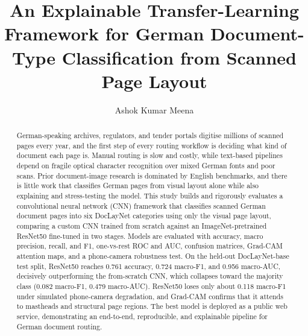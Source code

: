 \documentclass[preprint,12pt]{elsarticle}
\begin{document}
\begin{frontmatter}

\title{An Explainable Transfer-Learning Framework for German Document-Type
Classification from Scanned Page Layout}

\author[label1]{Ashok Kumar Meena}

\begin{abstract}
German-speaking archives, regulators, and tender portals digitise millions of
scanned pages every year, and the first step of every routing workflow is
deciding what kind of document each page is.
Manual routing is slow and costly, while text-based pipelines depend on
fragile optical character recognition over mixed German fonts and poor scans.
Prior document-image research is dominated by English benchmarks, and there is
little work that classifies German pages from visual layout alone while also
explaining and stress-testing the model.
This study builds and rigorously evaluates a convolutional neural network (CNN)
framework that classifies scanned German document pages into six DocLayNet
categories using only the visual page layout, comparing a custom CNN trained
from scratch against an ImageNet-pretrained ResNet50 fine-tuned in two stages.
Models are evaluated with accuracy, macro precision, recall, and F1, one-vs-rest
ROC and AUC, confusion matrices, Grad-CAM attention maps, and a phone-camera
robustness test.
On the held-out DocLayNet-base test split, ResNet50 reaches 0.761 accuracy,
0.724 macro-F1, and 0.956 macro-AUC, decisively outperforming the from-scratch
CNN, which collapses toward the majority class (0.082 macro-F1, 0.479 macro-AUC).
ResNet50 loses only about 0.118 macro-F1 under simulated phone-camera
degradation, and Grad-CAM confirms that it attends to mastheads and structural
page regions.
The best model is deployed as a public web service, demonstrating an
end-to-end, reproducible, and explainable pipeline for German document routing.
\end{abstract}


\end{frontmatter}
\end{document}
